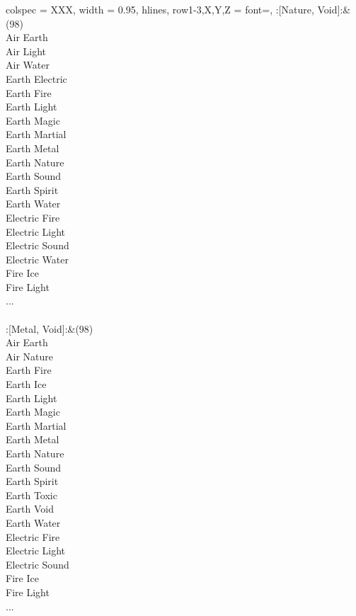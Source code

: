 \begin{longtblr}[
	caption = {2v2 Defending Weak},
	label = {2v2-Defending-Weak},
]{
	colspec = {XXX}, width = 0.95\linewidth,
	hlines,
	row{1-3,X,Y,Z} = {font=\bfseries},
}
	:[Nature, Void]:&{(98)\\
	Air Earth \\
	Air Light \\
	Air Water \\
	Earth Electric \\
	Earth Fire \\
	Earth Light \\
	Earth Magic \\
	Earth Martial \\
	Earth Metal \\
	Earth Nature \\
	Earth Sound \\
	Earth Spirit \\
	Earth Water \\
	Electric Fire \\
	Electric Light \\
	Electric Sound \\
	Electric Water \\
	Fire Ice \\
	Fire Light \\
	...\\
	}\\

	:[Metal, Void]:&{(98)\\
	Air Earth \\
	Air Nature \\
	Earth Fire \\
	Earth Ice \\
	Earth Light \\
	Earth Magic \\
	Earth Martial \\
	Earth Metal \\
	Earth Nature \\
	Earth Sound \\
	Earth Spirit \\
	Earth Toxic \\
	Earth Void \\
	Earth Water \\
	Electric Fire \\
	Electric Light \\
	Electric Sound \\
	Fire Ice \\
	Fire Light \\
	...\\
	}\\


\end{longtblr}
